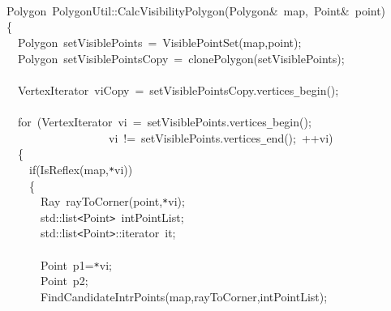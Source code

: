 \documentclass[a4paper,10pt]{article}
\begin{document}
{
\noindent \ttfamily
\jttstylea \\
\jttstylea \\
\jttstylea \\
\jttstylek Polygon~PolygonUtil::CalcVisibilityPolygon\jttstylei (\jttstylek Polygon\&~map,~Point\&~point\jttstylei )\\
\jttstylei \{\\
\jttstylea ~~\jttstylek Polygon~setVisiblePoints~=~VisiblePointSet\jttstylei (\jttstylek map,point\jttstylei )\jttstylek ;\\
\jttstylea ~~\jttstylek Polygon~setVisiblePointsCopy~=~clonePolygon\jttstylei (\jttstylek setVisiblePoints\jttstylei )\jttstylek ;\\
\jttstylea \\
\jttstylea ~~\jttstylek VertexIterator~viCopy~=~setVisiblePointsCopy.vertices\verb#_#begin\jttstylei ()\jttstylek ;\\
\jttstylea \\
\jttstylea ~~\jttstylee for~\jttstylei (\jttstylek VertexIterator~vi~=~setVisiblePoints.vertices\verb#_#begin\jttstylei ()\jttstylek ;\\
\jttstylea ~~~~~~~~~~~~~~~~~~\jttstylek vi~!=~setVisiblePoints.vertices\verb#_#end\jttstylei ()\jttstylek ;~++vi\jttstylei )\\
\jttstylea ~~\jttstylei \{\\
\jttstylea ~~~~\jttstylee if\jttstylei (\jttstylek IsReflex\jttstylei (\jttstylek map,\verb#*#vi\jttstylei ))\\
\jttstylea ~~~~\jttstylei \{\\
\jttstylea ~~~~~~\jttstylek Ray~rayToCorner\jttstylei (\jttstylek point,\verb#*#vi\jttstylei )\jttstylek ;\\
\jttstylea ~~~~~~\jttstylek std::list\verb#<#Point\verb#>#~intPointList;\\
\jttstylea ~~~~~~\jttstylek std::list\verb#<#Point\verb#>#::iterator~it;\\
\jttstylea \\
\jttstylea ~~~~~~\jttstylek Point~p1=\verb#*#vi;\\
\jttstylea ~~~~~~\jttstylek Point~p2;\\
\jttstylea ~~~~~~\jttstylek FindCandidateIntrPoints\jttstylei (\jttstylek map,rayToCorner,intPointList\jttstylei )\jttstylek ;\\
}
\end{document}
